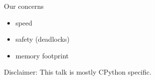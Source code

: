 \documentclass[14pt, usenames,dvipsnames]{beamer} %
\begin{document}
    \begin{frame}[t]{}
        \center
        \vspace{3em}
        \tableofcontents[
            subsectionstyle=show/hide/hide,
            sectionstyle=show/hide
            ]
    \end{frame}
    \begin{frame}[t]{Our concerns}
        \small
        \begin{itemize}
            \item speed
            \item safety (deadlocks)
            \item memory footprint
        \end{itemize}
    \end{frame}
    \begin{frame}[t]{}
        \vspace{5em}
        \center Disclaimer: This talk is mostly CPython specific.
    \end{frame}





\end{document}
